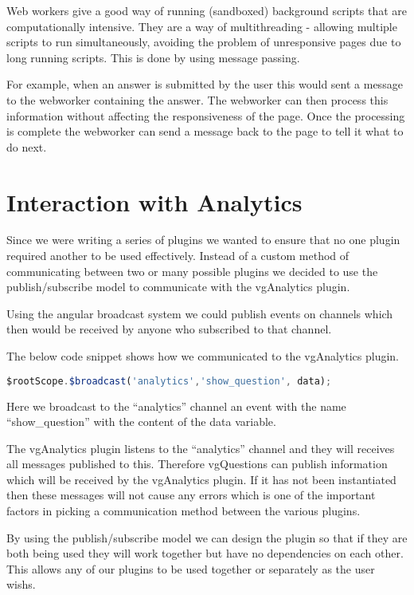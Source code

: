 Web workers give a good way of running (sandboxed) background scripts that are
computationally intensive. They are a way of multithreading - allowing multiple
scripts to run simultaneously, avoiding the problem of unresponsive pages due
to long running scripts. This is done by using message passing.

For example, when an answer is submitted by the user this would sent a message
to the webworker containing the answer. The webworker can then process this
information without affecting the responsiveness of the page. Once the
processing is complete the webworker can send a message back to the page to
tell it what to do next.

\section{Interaction with Analytics}
\label{Section:vgQuestions Analytics}

Since we were writing a series of plugins we wanted to ensure that no one
plugin required another to be used effectively. Instead of a custom method of
communicating between two or many possible plugins we decided to use the
publish/subscribe model to communicate with the vgAnalytics plugin.

Using the angular broadcast system we could publish events on channels which
then would be received by anyone who subscribed to that channel.

The below code snippet shows how we communicated to the vgAnalytics plugin.

\begin{lstlisting}[language=javascript]
$rootScope.$broadcast('analytics','show_question', data);
\end{lstlisting}

Here we broadcast to the ``analytics'' channel an event with the name
``show\_question'' with the content of the data variable.

The vgAnalytics plugin listens to the ``analytics'' channel and they will
receives all messages published to this. Therefore vgQuestions can publish
information which will be received by the vgAnalytics plugin. If it has not
been instantiated then these messages will not cause any errors which is one of
the important factors in picking a communication method between the various
plugins.

By using the publish/subscribe model we can design the plugin so that if they
are both being used they will work together but have no dependencies on each
other. This allows any of our plugins to be used together or separately as the
user wishs.
